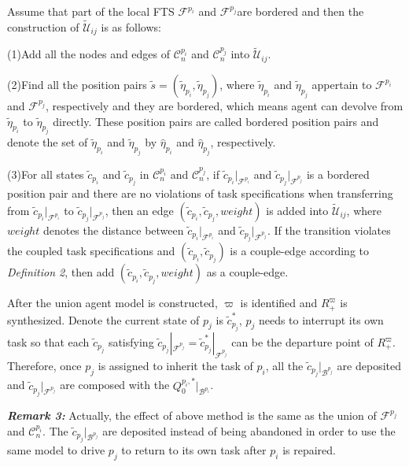 \documentclass[journal]{IEEEtran}
\begin{document}
Assume that part of the local FTS $\mathcal{F}^{p_i}$ and $\mathcal{F}^{p_j}$are bordered and then the construction of $\widetilde{\mathcal{U}}_{ij}$ is as follows:\par
(1)Add all the nodes and edges of $\mathcal{C}^{p_i}_n$ and $\mathcal{C}^{p_j}_n$ into $\widetilde{\mathcal{U}}_{ij}$.\par
(2)Find all the position pairs $\tilde{s}=(\tilde{\eta}_{p_i},\tilde{\eta}_{p_j})$, where $\tilde{\eta}_{p_i}$ and $\tilde{\eta}_{p_j}$ appertain to $\mathcal{F}^{p_i}$ and $\mathcal{F}^{p_j}$, respectively and they are bordered, which means agent can devolve from $\tilde{\eta}_{p_i}$ to $\tilde{\eta}_{p_j}$ directly. These position pairs are called bordered position pairs and denote the set of $\tilde{\eta}_{p_i}$ and $\tilde{\eta}_{p_j}$ by $\hat{\eta}_{p_i}$ and $\hat{\eta}_{p_j}$, respectively.\par
(3)For all states $\tilde{c}_{p_i}$ and $\tilde{c}_{p_j}$ in $\mathcal{C}^{p_i}_n$ and $\mathcal{C}^{p_j}_n$, if $\tilde{c}_{p_i}|_{\mathcal{F}^{p_i}}$ and $\tilde{c}_{p_j}|_{\mathcal{F}^{p_j}}$ is a bordered position pair and there are no violations of task specifications when transferring from $\tilde{c}_{p_i}|_{\mathcal{F}^{p_i}}$ to $\tilde{c}_{p_j}|_{\mathcal{F}^{p_j}}$, then an edge $(\tilde{c}_{p_i},\tilde{c}_{p_j},weight)$ is added into $\widetilde{\mathcal{U}}_{ij}$, where $weight$ denotes the distance between $\tilde{c}_{p_i}|_{\mathcal{F}^{p_i}}$ and $\tilde{c}_{p_j}|_{\mathcal{F}^{p_j}}$. If the transition violates the coupled task specifications and $(\tilde{c}_{p_i},\tilde{c}_{p_j})$ is a couple-edge according to \emph{Definition 2}, then add $(\tilde{c}_{p_i},\tilde{c}_{p_j},weight)$ as a couple-edge.\par
After the union agent model is constructed, $\varpi$ is identified and $R^{\varpi}_+$ is synthesized. Denote the current state of $p_j$ is $\tilde{c}_{p_j}^{\ast}$, $p_j$ needs to interrupt its own task so that each $\tilde{c}_{p_j}$ satisfying $\tilde{c}_{p_j}|_{\mathcal{F}^{p_j}}=\tilde{c}_{p_j}^{\ast}|_{\mathcal{F}^{p_j}}$ can be the departure point of $R^{\varpi}_+$. Therefore, once $p_j$ is assigned to inherit the task of $p_i$, all the $\tilde{c}_{p_j}|_{\mathcal{B}^{p_j}}$ are deposited and $\tilde{c}_{p_j}|_{\mathcal{F}^{p_j}}$ are composed with the $Q^{p_i,\ast}_0|_{\mathcal{B}^{p_i}}$.

\textbf{\emph{Remark 3:}} Actually, the effect of above method is the same as the union of $\mathcal{F}^{p_j}$ and $\mathcal{C}^{p_i}_n$. The $\tilde{c}_{p_j}|_{\mathcal{B}^{p_j}}$ are deposited instead of being abandoned in order to use the same model to drive $p_j$ to return to its own task after $p_i$ is repaired.
\end{document}
